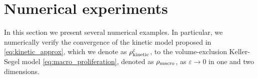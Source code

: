 \documentclass[review,onefignum,onetabnum]{siamart220329}
\newcommand {\e}  {\varepsilon}
\newcommand {\dt}   {\Delta t}
\begin{document}

\section{Numerical experiments}\label{numerical results}

In this section we present several numerical examples.
In particular, we {numerically verify} the convergence of the kinetic model proposed in \cref{eq:kinetic_approx}, which we denote as $\rho_\textnormal{kinetic}^\e$, to the volume-exclusion Keller-Segel model \cref{eq:macro_proliferation}, denoted as $\rho_\textnormal{macro}$, as $\varepsilon\to 0$ in one and two dimensions. 
\end{document}

